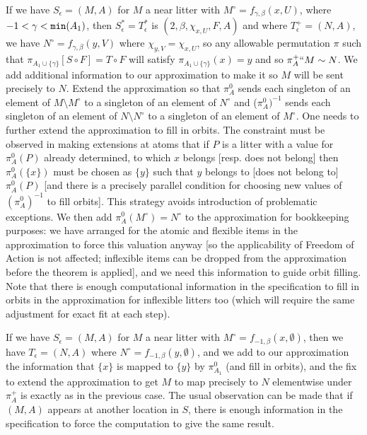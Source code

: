 \documentclass[112pt]{article}
\begin{document}
\begin{description}
If we have $S_\epsilon= (M,A)$ for $M$ a near litter with $M^\circ = f_{\gamma,\beta}(x,U)$, where $-1<\gamma<{\tt min}(A_1)$,
then $S^*_\epsilon=T^*_\epsilon$ is $(2,\beta,\chi_{x,U}, F,A)$ and where $T^+_\epsilon=(N,A)$,  we have $N^\circ = f_{\gamma,\beta}(y,V)$
where $\chi_{y,V} = \chi_{x,U}$, so any allowable permutation $\pi$ such that $\pi_{A_1 \cup \{\gamma\}}[S \circ F] = T \circ F$ will satisfy $\pi_{A_1 \cup \{\gamma\}}(x) = y$ and  so $\pi^+_A``M \sim N$.
We add additional information to our approximation to make it so $M$ will be sent precisely to $N$.
Extend the approximation so that $\pi^0_{A}$ sends each singleton of an element of $M\setminus M^\circ$ to a singleton of an element of $N^\circ$ and ($\pi^0_A)^{-1}$ sends each singleton of an element of $N\setminus N^\circ$ to a singleton of an  element of $M^\circ$.  One needs to further extend the approximation to fill in orbits.  The constraint must be observed in making extensions at atoms  that if $P$ is a litter with a value for
$\pi^0_A(P)$ already determined, to which $x$ belongs [resp. does not belong] then $\pi^0_A(\{x\})$ must be chosen as $\{y\}$ such that
$y$ belongs to [does not belong to] $\pi^0_A(P)$ [and there is a precisely parallel condition for choosing new values of $(\pi^0_A)^{-1}$ to fill orbits].  This strategy avoids introduction of problematic exceptions.  We then add $\pi^0_A(M^\circ) = N^\circ$ to the approximation for bookkeeping purposes:  we have arranged for the atomic and flexible items in the approximation to force this valuation anyway [so the applicability of Freedom of Action is not affected; inflexible items can be dropped from the approximation before the theorem  is applied], and we need this information to guide orbit filling.
Note that there is enough computational information in the specification to fill in orbits in the approximation for inflexible litters too (which will require the same adjustment for exact fit at each step).

If we have $S_\epsilon= (M,A)$ for $M$ a near litter with $M^\circ = f_{-1,\beta}(x,\emptyset)$, then we have $T_\epsilon=(N,A)$
where  $N^\circ = f_{-1,\beta}(y,\emptyset)$, and we add to our approximation the information that $\{x\}$ is mapped to 
$\{y\}$ by $\pi^0_{A_1}$ (and fill in orbits), and the fix to extend the approximation to get $M$ to map precisely to $N$ elementwise under $\pi^+_A$ is exactly as in the previous case.  The usual observation can be made that if $(M,A)$ appears at another location in $S$, there is enough information in the specification to force the computation to give the same result.


\end{description}
\end{document}
